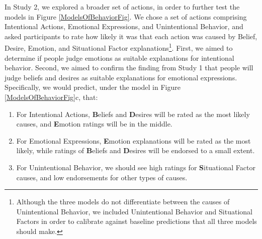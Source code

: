 \documentclass[10pt,letterpaper]{article}
\newcommand{\ndg}[1]{\textcolor{Green}{[ndg: #1]}}
\begin{document}
In Study 2, we explored a broader set of actions, in order to further test the models in Figure \ref{ModelsOfBehaviorFig}. We chose a set of actions comprising Intentional Actions, Emotional Expressions, and Unintentional Behavior, and asked participants to rate how likely it was that each action was caused by Belief, Desire, Emotion, and Situational Factor explanations\footnote{Although the three models do not differentiate between the causes of Unintentional Behavior, we included Unintentional Behavior and Situational Factors in order to calibrate against baseline predictions that all three models should make.
}. First, we aimed to determine if people judge emotions as suitable explanations for intentional behavior. Second, we aimed to confirm the finding from Study 1 that people will judge beliefs and desires as suitable explanations for emotional expressions. 
Specifically, we would predict, under the model in Figure \ref{ModelsOfBehaviorFig}c, that:
\begin{enumerate}
\item For Intentional Actions, %
\textbf{B}eliefs and \textbf{D}esires will be rated as the most likely causes, and \textbf{E}motion ratings will be in the middle. %
\item For Emotional Expressions, %
\textbf{E}motion explanations will be rated as the most likely, while ratings of \textbf{B}eliefs and \textbf{D}esires will be endorsed to a small extent. %
\item For Unintentional Behavior, %
we should see high ratings for \textbf{S}ituational Factor causes, and low endorsements for other types of causes. %
\end{enumerate}
\end{document}
